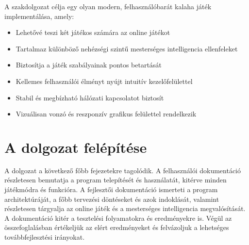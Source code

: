 A szakdolgozat célja egy olyan modern, felhasználóbarát kalaha játék implementálása, amely:
\begin{itemize}
	\item Lehetővé teszi két játékos számára az online játékot
	\item Tartalmaz különböző nehézségi szintű mesterséges intelligencia ellenfeleket
	\item Biztosítja a játék szabályainak pontos betartását
	\item Kellemes felhasználói élményt nyújt intuitív kezelőfelülettel
	\item Stabil és megbízható hálózati kapcsolatot biztosít
	\item Vizuálisan vonzó és reszponzív grafikus felülettel rendelkezik
\end{itemize}

\section{A dolgozat felépítése}

A dolgozat a következő főbb fejezetekre tagolódik. A felhasználói dokumentáció részletesen bemutatja a program telepítését és használatát, kitérve minden játékmódra és funkcióra. A fejlesztői dokumentáció ismerteti a program architektúráját, a főbb tervezési döntéseket és azok indoklását, valamint részletesen tárgyalja az online játék és a mesterséges intelligencia megvalósítását. A dokumentáció kitér a tesztelési folyamatokra és eredményekre is. Végül az összefoglalásban értékeljük az elért eredményeket és felvázoljuk a lehetséges továbbfejlesztési irányokat.